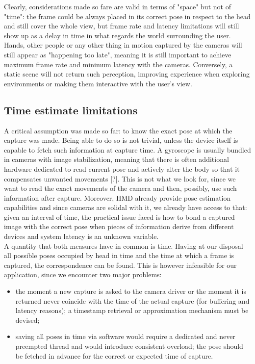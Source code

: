 Clearly, considerations made so fare are valid in terms of "space" but not of "time": the frame could be always placed in its correct pose in respect to the head and still cover the whole view, but frame rate and latency limitations will still show up as a delay in time in what regards the world surrounding the user. Hands, other people or any other thing in motion captured by the cameras will still appear as "happening too late", meaning it is still important to achieve maximum frame rate and minimum latency with the cameras. Conversely, a static scene will not return such perception, improving experience when exploring environments or making them interactive with the user's view.

\subsection{Time estimate limitations}
A critical assumption was made so far: to know the exact pose at which the capture was made. Being able to do so is not trivial, unless the device itself is capable to fetch such information at capture time. A gyroscope is usually bundled in cameras with image stabilization, meaning that there is often additional hardware dedicated to read current pose and actively alter the body so that it compensates unwanted movements [?]. This is not what we look for, since we want to read the exact movements of the camera and then, possibly, use such information after capture. Moreover, HMD already provide pose estimation capabilities and since cameras are solidal with it, we already have access to that: given an interval of time, the practical issue faced is how to bond a captured image with the correct pose when pieces of information derive from different devices and system latency is an unknown variable.\\
A quantity that both measures have in common is time. Having at our disposal all possible poses occupied by head in time and the time at which a frame is captured, the correspondence can be found. This is however infeasible for our application, since we encounter two major problems:
\begin{itemize}
\item the moment a new capture is asked to the camera driver or the moment it is returned never coincide with the time of the actual capture (for buffering and latency reasons); a timestamp retrieval or approximation mechanism must be devised;
\item saving all poses in time via software would require a dedicated and never preempted thread and would introduce consistent overload; the pose should be fetched in advance for the correct or expected time of capture.
\end{itemize}
